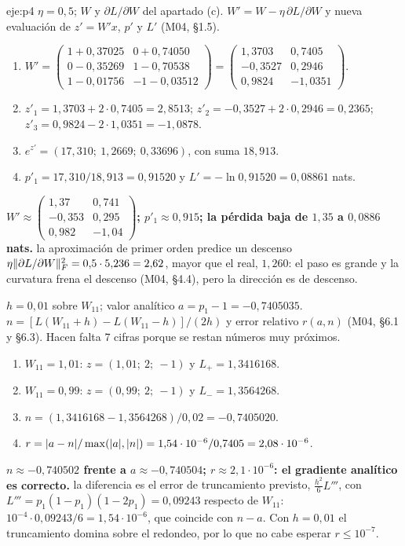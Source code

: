 \begin{solucion}{eje:p4}
\datos $\eta=0{,}5$; $W$ y $\partial L/\partial W$ del apartado (c).
\planteamiento $W'=W-\eta\,\partial L/\partial W$ y nueva evaluación de $z'=W'x$, $p'$ y $L'$ (M04, §1.5).
\pasos
\begin{enumerate}[label=\arabic*.]
  \item $W'=\begin{pmatrix}1+0{,}37025&0+0{,}74050\\0-0{,}35269&1-0{,}70538\\1-0{,}01756&-1-0{,}03512\end{pmatrix}=\begin{pmatrix}1{,}3703&0{,}7405\\-0{,}3527&0{,}2946\\0{,}9824&-1{,}0351\end{pmatrix}$.
  \item $z'_1=1{,}3703+2\cdot0{,}7405=2{,}8513$; $z'_2=-0{,}3527+2\cdot0{,}2946=0{,}2365$; $z'_3=0{,}9824-2\cdot1{,}0351=-1{,}0878$.
  \item $e^{z'}=(17{,}310;\ 1{,}2669;\ 0{,}33696)$, con suma $18{,}913$.
  \item $p'_1=17{,}310/18{,}913=0{,}91520$ y $L'=-\ln0{,}91520=0{,}08861$ nats.
\end{enumerate}
\resultado \textbf{$W'\approx\begin{pmatrix}1{,}37&0{,}741\\-0{,}353&0{,}295\\0{,}982&-1{,}04\end{pmatrix}$; $p'_1\approx0{,}915$; la pérdida baja de $1{,}35$ a $0{,}0886$ nats.}
\comprobacion la aproximación de primer orden predice un descenso $\eta\lVert\partial L/\partial W\rVert_F^{2}=0{,}5\cdot5{,}236=2{,}62$, mayor que el real, $1{,}260$: el paso es grande y la curvatura frena el descenso (M04, §4.4), pero la dirección es de descenso.

\datos $h=0{,}01$ sobre $W_{11}$; valor analítico $a=p_1-1=-0{,}7405035$.
\planteamiento $n=[L(W_{11}+h)-L(W_{11}-h)]/(2h)$ y error relativo $r(a,n)$ (M04, §6.1 y §6.3). Hacen falta 7 cifras porque se restan números muy próximos.
\pasos
\begin{enumerate}[label=\arabic*.]
  \item $W_{11}=1{,}01$: $z=(1{,}01;\ 2;\ -1)$ y $L_+=1{,}3416168$.
  \item $W_{11}=0{,}99$: $z=(0{,}99;\ 2;\ -1)$ y $L_-=1{,}3564268$.
  \item $n=(1{,}3416168-1{,}3564268)/0{,}02=-0{,}7405020$.
  \item $r=\lvert a-n\rvert/\max(\lvert a\rvert,\lvert n\rvert)=1{,}54\cdot10^{-6}/0{,}7405=2{,}08\cdot10^{-6}$.
\end{enumerate}
\resultado \textbf{$n\approx-0{,}740502$ frente a $a\approx-0{,}740504$; $r\approx2{,}1\cdot10^{-6}$: el gradiente analítico es correcto.}
\comprobacion la diferencia es el error de truncamiento previsto, $\tfrac{h^{2}}{6}L'''$, con $L'''=p_1(1-p_1)(1-2p_1)=0{,}09243$ respecto de $W_{11}$: $10^{-4}\cdot0{,}09243/6=1{,}54\cdot10^{-6}$, que coincide con $n-a$. Con $h=0{,}01$ el truncamiento domina sobre el redondeo, por lo que no cabe esperar $r\le10^{-7}$.


\end{solucion}
